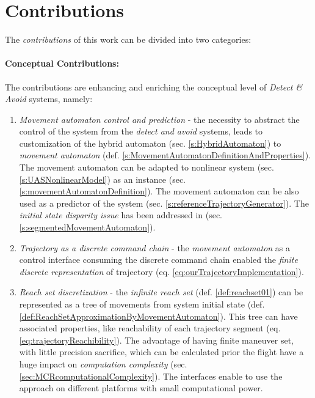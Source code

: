 \section{Contributions}\label{s:Contributions} 
\noindent The \emph{contributions} of this work can be divided into two categories:
    
\paragraph{Conceptual Contributions:} The contributions are enhancing and enriching the conceptual level of \emph{Detect \& Avoid} systems, namely:

\begin{enumerate}
    \item \emph{Movement automaton control and prediction} -  the necessity to abstract the control of the system from the \emph{detect and avoid} systems, leads to customization of the hybrid automaton (sec. \ref{s:HybridAutomaton}) to \emph{movement automaton} (def. \ref{s:MovementAutomatonDefinitionAndProperties}). The movement automaton can be adapted to nonlinear system (sec. \ref{s:UASNonlinearModel}) as an instance (sec. \ref{s:movementAutomatonDefinition}). The movement automaton can be also used as a predictor of the system (sec. \ref{s:referenceTrajectoryGenerator}). The \emph{initial state disparity issue} \cite{gomola2017obstacle} has been addressed in (sec. \ref{s:segmentedMovementAutomaton}).
    
    \item \emph{Trajectory as a discrete command chain} -  the \emph{movement automaton} as a control interface consuming the discrete command chain enabled the \emph{finite discrete representation} of trajectory (eq. \ref{eq:ourTrajectoryImplementation}).
    
    \item \emph{Reach set discretization} - the \emph{infinite reach set} (def. \ref{def:reachset01}) can be represented as a tree of movements from system initial state (def. \ref{def:ReachSetApproximationByMovementAutomaton}). This tree can have associated properties, like reachability of each trajectory segment (eq. \ref{eq:trajectoryReachibility}).  The advantage of having finite maneuver set, with little precision sacrifice, which can be calculated prior the flight have a huge impact on \emph{computation complexity} (sec. \ref{sec:MCRcomputationalComplexity}). The interfaces enable to use the approach on different platforms with small computational power. 
    

\end{enumerate}
